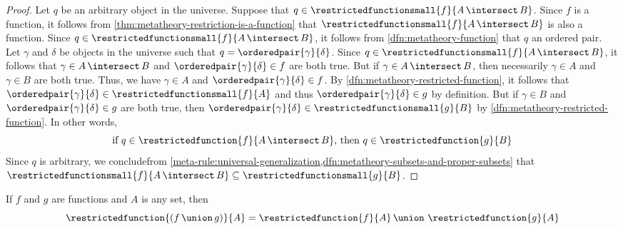 \begin{proof}
    \vspace{0.3cm}
    \noindent
    Let \( q \) be an arbitrary object in the universe.
    Suppose that \( q \in \restrictedfunctionsmall{f}{A \,{\intersect}\, B} \).
    Since \( f \) is a function, it follows from \cref{thm:metatheory-restriction-is-a-function} that
    \( \restrictedfunctionsmall{f}{A \,{\intersect}\, B} \) is also a function.
    Since \( q \in \restrictedfunctionsmall{f}{A \,{\intersect}\, B} \), it follows from
    \cref{dfn:metatheory-function} that \( q \) an ordered pair.
    Let \( \gamma \) and \( \delta \) be objects in the universe such that \( q = \orderedpair{\gamma}{\delta} \).
    Since \( q \in \restrictedfunctionsmall{f}{A \,{\intersect}\, B} \), it follows that \( \gamma \in A \,{\intersect}\, B \)
    and \( \orderedpair{\gamma}{\delta} \in f \) are both true.
    But if \( \gamma \in A \,{\intersect}\, B \), then necessarily \( \gamma \in A \) and \( \gamma \in B \) are both true.
    Thus, we have \( \gamma \in A \) and \( \orderedpair{\gamma}{\delta} \in f \).
    By \cref{dfn:metatheory-restricted-function}, it follows that \( \orderedpair{\gamma}{\delta} \in \restrictedfunctionsmall{f}{A} \) and thus
    \( \orderedpair{\gamma}{\delta} \in g \) by definition.
    But if \( \gamma \in B \) and \( \orderedpair{\gamma}{\delta} \in g \) are both true, then \( \orderedpair{\gamma}{\delta} \in \restrictedfunctionsmall{g}{B} \)
    by \cref{dfn:metatheory-restricted-function}.
    In other words,
    \begin{equation*}
        \text{if \( q \in \restrictedfunction{f}{A \,{\intersect}\, B} \), then \( q \in \restrictedfunction{g}{B} \)}
    \end{equation*}
    Since \( q \) is arbitrary, we concludefrom \cref{meta-rule:universal-generalization,dfn:metatheory-subsets-and-proper-subsets} that
    \( \restrictedfunctionsmall{f}{A \,{\intersect}\, B} \subseteq \restrictedfunctionsmall{g}{B} \).
\end{proof}

\begin{thm}
     \label{thm:metatheory-restriction-of-union-of-compatible-functions-equals-the-union-of-restrictions}
    If \( f \) and \( g \) are  functions and \( A \) is any set, then
    \begin{equation*}
        \restrictedfunction{\mleft(f \,{\union}\, g\mright)}{A} = \restrictedfunction{f}{A} \,{\union}\,\, \restrictedfunction{g}{A}
    \end{equation*}
\end{thm}

